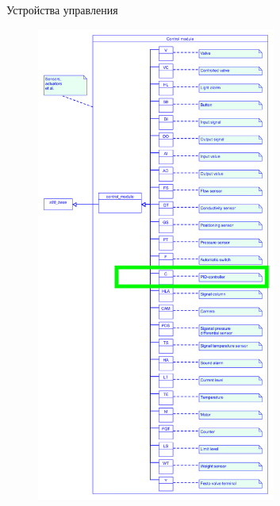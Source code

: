 \documentclass{beamer}
\begin{document}
{    \begin{frame}{Устройства управления}
        \begin{figure}
            \centering
            \includegraphics[width=0.7\textwidth]{images/control-modules-s88.png}
        \end{figure}
      \end{frame}
 }
\end{document}
